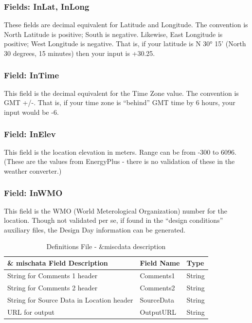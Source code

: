 \subsubsection{Fields: InLat, InLong}\label{fields-inlat-inlong}

These fields are decimal equivalent for Latitude and Longitude. The convention is North Latitude is positive; South is negative. Likewise, East Longitude is positive; West Longitude is negative. That is, if your latitude is N 30° 15' (North 30 degrees, 15 minutes) then your input is +30.25.

\subsubsection{Field: InTime}\label{field-intime}

This field is the decimal equivalent for the Time Zone value. The convention is GMT +/-. That is, if your time zone is ``behind'' GMT time by 6 hours, your input would be -6.

\subsubsection{Field: InElev}\label{field-inelev}

This field is the location elevation in meters. Range can be from -300 to 6096. (These are the values from EnergyPlus - there is no validation of these in the weather converter.)

\subsubsection{Field: InWMO}\label{field-inwmo}

This field is the WMO (World Meterological Organization) number for the location. Though not validated per se, if found in the ``design conditions'' auxiliary files, the Design Day information can be generated.

\begin{longtable}[c]{@{}lll@{}}
\caption{Definitions File - \&miscdata description \protect \label{table:definitions-file-miscdata-description}}\\
\toprule 
\& mischata Field Description & Field Name & Type \tabularnewline \midrule
\endhead
String for Comments 1 header & Comments1 & String \tabularnewline
String for Comments 2 header & Comments2 & String \tabularnewline
String for Source Data in Location header & SourceData & String \tabularnewline
URL for output & OutputURL & String \tabularnewline
\bottomrule
\end{longtable}


